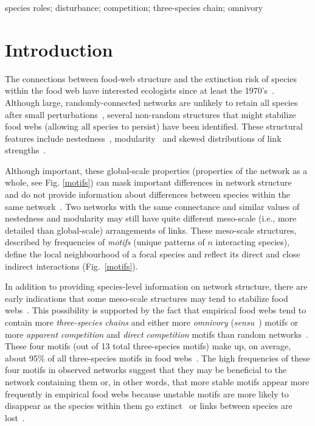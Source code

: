 \documentclass[12pt]{article}
\begin{document}
\begin{spacing}{2.0}
	species roles; disturbance; competition; three-species chain; omnivory

\clearpage
    
\section*{Introduction}

	The connections between food-web structure and the extinction risk of species within the food web have interested ecologists since at least the 1970's~\citep{May1972}. Although large, randomly-connected networks are unlikely to retain all species after small perturbations~\citep{Gardner1970,May1972}, several non-random structures that might stabilize food webs (allowing all species to persist) have been identified. These structural features include nestedness~\citep{Allesina2012,Sauve2014}, modularity~\citep{Sauve2014,Thebault2010} and skewed distributions of link strengths~\citep{McCann1998,Gross2009,Rooney2012,Wootton2016}.
	
	
	Although important, these global-scale properties (properties of the network as a whole, see Fig. \ref{motifs}) can mask important differences in  network structure~\citep{Simmons2019} and do not provide information about differences between species within the same network~\citep{Cirtwill2018FoodWebs}. 
	Two networks with the same connectance and similar values of nestedness and modularity may still have quite different meso-scale (i.e., more detailed than global-scale) arrangements of links. 
	These meso-scale structures, described by frequencies of \emph{motifs} (unique patterns of $n$ interacting species), define the local neighbourhood of a focal species and reflect its direct and close indirect interactions (Fig.~\ref{motifs}).
	
	
    In addition to providing species-level information on network structure, there are early indications that some meso-scale structures may tend to stabilize food webs~\citep{Prill2005,Borrelli2015,Monteiro2016}. 
    This possibility is supported by the fact that empirical food webs tend to contain more \emph{three-species chains} and either more \emph{omnivory} (\emph{sensu}~\citealp[]{Thompson2007b}) motifs or more \emph{apparent competition} and \emph{direct competition} motifs than random networks~\citep{Stouffer2007}. 
    These four motifs (out of 13 total three-species motifs) make up, on average, about 95\% of all three-species motifs in food webs~\citep{Stouffer2010b}. 
    The high frequencies of these four motifs in observed networks suggest that they may be beneficial to the network containing them or, in other words, that more stable motifs appear more frequently in empirical food webs because unstable motifs are more likely to disappear as the species within them go extinct~\citep{Borrelli2015,Borrelli2015a} or links between species are lost~\citep{Tylianakis2010}.


\end{spacing}
\end{document}
